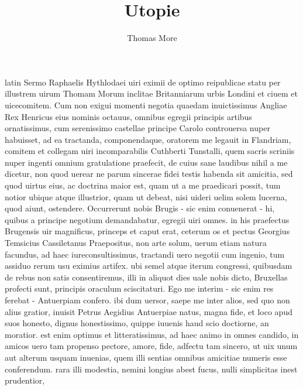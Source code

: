 \documentclass[12pt,a4paper]{book}
\renewenvironment{latin}
    	{\begin{hyphenrules}{latin}}
    	{\end{hyphenrules}}
\begin{document}
\author{Thomas More}
\title{Utopie}
\date{}

\maketitle


\begin{pages}
    \begin{Leftside} 
    \begin{latin}
    \beginnumbering
    \pstart
    Sermo Raphaelis Hythlodaei uiri eximii de optimo reipublicae statu per illustrem uirum Thomam Morum inclitae Britanniarum urbis Londini et ciuem et uicecomitem. 
Cum non exigui momenti negotia quaedam inuictissimus Angliae Rex Henricus eius 
nominis octauus, omnibus egregii principis artibus ornatissimus, cum serenissimo 
castellae principe Carolo controuersa nuper habuisset, ad ea tractanda, 
componendaque, oratorem me legauit in Flandriam, comitem et collegam uiri 
incomparabilis Cuthberti Tunstalli, quem sacris scriniis nuper ingenti omnium 
gratulatione praefecit, de cuius sane laudibus nihil a me dicetur, non quod 
uerear ne parum sincerae fidei testis habenda sit amicitia, sed quod uirtus 
eius, ac doctrina maior est, quam ut a me praedicari possit, tum notior ubique 
atque illustrior, quam ut debeat, nisi uideri uelim solem lucerna, quod aiunt, 
ostendere. 
\pend
\pstart
Occurrerunt nobis Brugis - sic enim conuenerat - hi, quibus a principe negotium 
demandabatur, egregii uiri omnes. in his praefectus Brugensis uir magnificus, 
princeps et caput erat, ceterum os et pectus Georgius Temsicius Cassiletanus 
Praepositus, non arte solum, uerum etiam natura facundus, ad haec 
iureconsultissimus, tractandi uero negotii cum ingenio, tum assiduo rerum usu 
eximius artifex. ubi semel atque iterum congressi, quibusdam de rebus non satis 
consentiremus, illi in aliquot dies uale nobis dicto, Bruxellas profecti sunt, 
principis oraculum sciscitaturi. 
\pend
\pstart
Ego me interim - sic enim res ferebat - Antuerpiam confero. ibi dum uersor, 
saepe me inter alios, sed quo non alius gratior, inuisit Petrus Aegidius 
Antuerpiae natus, magna fide, et loco apud suos honesto, dignus honestissimo, 
quippe iuuenis haud scio doctiorne, an moratior. est enim optimus et 
litteratissimus, ad haec animo in omnes candido, in amicos uero tam propenso 
pectore, amore, fide, adfectu tam sincero, ut uix unum aut alterum usquam 
inuenias, quem illi sentias omnibus amicitiae numeris esse conferendum. rara 
illi modestia, nemini longius abest fucus, nulli simplicitas inest prudentior, 

\end{latin}
\end{Leftside}
\end{pages}
\end{document}
